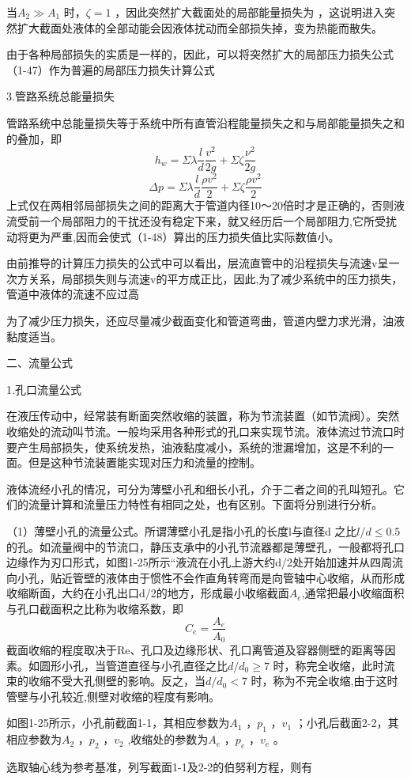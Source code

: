 当$ A_2\gg A_1 $ 时，$ \zeta =1 $ ，因此突然扩大截面处的局部能量损失为 ，这说明进入突然扩大截面处液体的全部动能会因液体扰动而全部损失掉，变为热能而散失。

由于各种局部损失的实质是一样的，因此，可以将突然扩大的局部压力损失公式（1-47）作为普遍的局部压力损失计算公式

3.管路系统总能量损失

管路系统中总能量损失等于系统中所有直管沿程能量损失之和与局部能量损失之和的叠加，即
$$ h_w=\varSigma \lambda \frac{l}{d}\frac{v^2}{2g}+\varSigma \zeta \frac{\nu ^2}{2g} $$ 
$$ \varDelta p=\varSigma \lambda \frac{l}{d}\frac{\rho v^2}{2}+\varSigma \zeta \frac{\rho v^2}{2} $$ 
上式仅在两相邻局部损失之间的距离大于管道内径10〜20倍时才是正确的，否则液流受前一个局部阻力的干扰还没有稳定下来，就又经历后一个局部阻力,它所受扰动将更为严重,因而会使式（1-48）算出的压力损失值比实际数值小。

由前推导的计算压力损失的公式中可以看出，层流直管中的沿程损失与流速v呈一次方关系，局部损失则与流速v的平方成正比，因此,为了减少系统中的压力损失，管道中液体的流速不应过高

为了减少压力损失，还应尽量减少截面变化和管道弯曲，管道内壁力求光滑，油液黏度适当。

二、流量公式

1.孔口流量公式

在液压传动中，经常装有断面突然收缩的装置，称为节流装置（如节流阀）。突然收缩处的流动叫节流。一般均采用各种形式的孔口来实现节流。液体流过节流口时要产生局部损失，使系统发热，油液黏度减小，系统的泄漏增加，这是不利的一面。但是这种节流装置能实现对压力和流量的控制。

液体流经小孔的情况，可分为薄壁小孔和细长小孔，介于二者之间的孔叫短孔。它们的流量计算和流量压力特性有相同之处，也有区别。下面将分别进行分析。

（1）薄壁小孔的流量公式。所谓薄壁小孔是指小孔的长度l与直径d 之比$ l/d\le 0.5 $ 的孔。如流量阀中的节流口，静压支承中的小孔节流器都是薄壁孔，一般都将孔口边缘作为刃口形式，如图1-25所示“液流在小孔上游大约d/2处开始加速并从四周流向小孔，贴近管壁的液体由于惯性不会作直角转弯而是向管轴中心收缩，从而形成收缩断面，大约在小孔出口d/2的地方，形成最小收缩截面$ A_e $,通常把最小收缩面积与孔口截面积之比称为收缩系数，即
$$ C_e=\frac{A_e}{A_0} $$
截面收缩的程度取决于Re、孔口及边缘形状、孔口离管道及容器侧壁的距离等因素。如圆形小孔，当管道直径与小孔直径之比$ d/d_0\ge 7 $ 时，称完全收缩，此时流束的收缩不受大孔侧壁的影响。反之，当$ d/d_0<7 $ 时，称为不完全收缩,由于这时管壁与小孔较近,侧壁对收缩的程度有影响。

如图1-25所示，小孔前截面1-1，其相应参数为$ A_1 $ ，$ p_1 $ ，$ v_1 $ ；小孔后截面2-2，其相应参数为$ A_2 $ ，$ p_2 $ ，$ v_2 $ ,收缩处的参数为$ A_e $ ，$ p_e $ ，$ v_e $ 。

选取轴心线为参考基准，列写截面1-1及2-2的伯努利方程，则有

